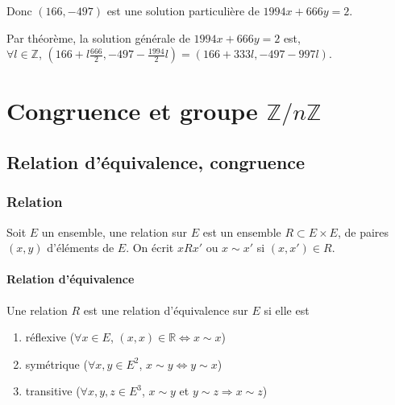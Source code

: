 \documentclass[a4paper,10pt]{book} %
\newcommand{\R}{\mathbb{R}}
\newcommand{\Z}{\mathbb{Z}}
\begin{document}
Donc $(166,-497)$ est une solution particulière de $1994x+666y=2$.\bigskip

Par théorème, la solution générale de $1994x+666y=2$ est,\\
$\forall l\in \Z$, $(166+l\frac{666}{2},-497-\frac{1994}{2}l)=(166+333l,-497-997l)$.

\newpage

\chapter{Congruence et groupe $\Z/n\Z$}
\section{Relation d'équivalence, congruence}
\subsection{Relation}
Soit $E$ un ensemble, une relation sur $E$ est un ensemble $R\subset E\times E$, de paires $(x,y)$ d'éléments de $E$. On écrit $xRx'$ ou $x\sim x'$ si $(x,x')\in R$.

\subsubsection{Relation d'équivalence}
Une relation $R$ est une relation d'équivalence sur $E$ si elle est 
\begin{enumerate}
\item réflexive ($\forall x\in E$, $(x,x)\in \R \Leftrightarrow x\sim x$)
\item symétrique ($\forall x,y\in E^2$, $x\sim y\Leftrightarrow y\sim x$)
\item transitive ($\forall x,y,z\in E^3$, $x\sim y$ et $y\sim z\Rightarrow x\sim z$)
\end{enumerate}
\end{document}
